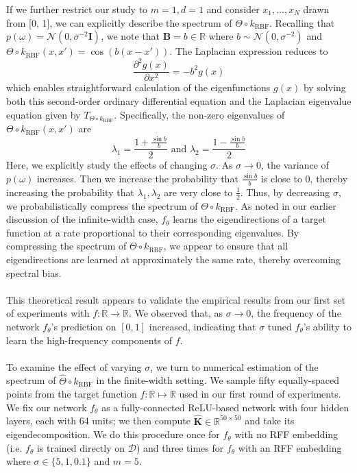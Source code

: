 \documentclass[11pt]{article}
\newcommand{\R}{\mathbb{R}}
\begin{document}
\noindent If we further restrict our study to $m = 1, d = 1$ and consider $x_1, \dots, x_N$ drawn from [0, 1], we can explicitly describe the spectrum of $\Theta \circ k_\text{RBF}$. Recalling that  $p(\omega) = \mathcal{N}(0, \sigma^{-2}\mathbf{I})$, we note that $\mathbf{B} = b \in \R$ where $b \sim \mathcal{N}(0, \sigma^{-2})$ and $\Theta \circ k_\text{RBF}(x, x') = \cos(b(x - x'))$. The Laplacian expression reduces to
$$\frac{\partial^2g(x)}{\partial x^2} = -b^2g(x)$$
which enables straightforward calculation of the eigenfunctions $g(x)$ by solving both this second-order ordinary differential equation and the Laplacian eigenvalue equation given by $T_{\Theta \circ k_\text{RBF}}$. Specifically, the non-zero eigenvalues of $\Theta \circ k_\text{RBF}(x, x')$ are
$$\lambda_1 = \frac{1 + \frac{\sin b}{b}}{2} \text{  and  } \lambda_2 = \frac{1 - \frac{\sin b}{b}}{2}$$
Here, we explicitly study the effects of changing $\sigma$. As $\sigma \rightarrow 0$, the variance of $p(\omega)$ increases. Then we increase the probability that $\frac{\sin b}{b}$ is close to 0, thereby increasing the probability that $\lambda_1, \lambda_2$ are very close to $\frac12$. Thus, by decreasing $\sigma$, we probabilistically compress the spectrum of $\Theta \circ k_\text{RBF}$. As noted in our earlier discussion of the infinite-width case, $f_\theta$ learns the eigendirections of a target function at a rate proportional to their corresponding eigenvalues. By compressing the spectrum of $\Theta \circ k_\text{RBF}$, we appear to ensure that all eigendirections are learned at approximately the same rate, thereby overcoming spectral bias.\\ 
\\
This theoretical result appears to validate the empirical results from our first set of experiments with $f: \R \rightarrow \R$. We observed that, as $\sigma \rightarrow 0$, the frequency of the network $f_\theta$'s prediction on $[0, 1]$ increased, indicating that $\sigma$ tuned $f_\theta$'s ability to learn the high-frequency components of $f$.\\
\\
To examine the effect of varying $\sigma$, we turn to numerical estimation of the spectrum of $\hat{\Theta} \circ k_\text{RBF}$ in the finite-width setting. We sample fifty equally-spaced points from the target function $f : \R \mapsto \R$ used in our first round of experiments. We fix our network $f_\theta$ as a fully-connected ReLU-based network with four hidden layers, each with 64 units; we then compute $\hat{\mathbf{K}} \in \R^{50 \times 50}$ and take its eigendecomposition. We do this procedure once for $f_\theta$ with no RFF embedding (i.e. $f_\theta$ is trained directly on $\mathcal{D}$) and three times for $f_\theta$ with an RFF embedding where $\sigma \in \{5, 1, 0.1\}$ and $m = 5$.
\end{document}
